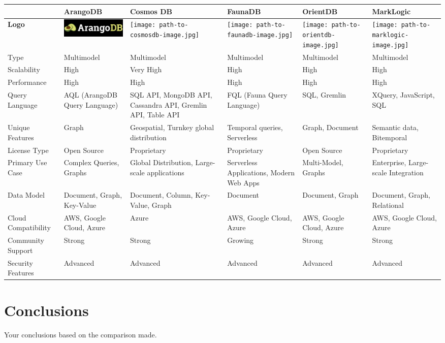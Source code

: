 \documentclass[a3paper,11pt]{extarticle}
\begin{document}
\begin{table}[h!]
\centering
\begin{tabularx}{\textwidth}{|>{\centering\arraybackslash}X|X|X|X|X|X|}
\hline
\rowcolor{gray!25}
& \textbf{ArangoDB} & \textbf{Cosmos DB} & \textbf{FaunaDB} & \textbf{OrientDB} & \textbf{MarkLogic} \\
\hline
\cellcolor{gray!25}\textbf{Logo} & \includegraphics[width=4.5cm]{arango.png} & \texttt{[image: path-to-cosmosdb-image.jpg]} & \texttt{[image: path-to-faunadb-image.jpg]} & \texttt{[image: path-to-orientdb-image.jpg]} & \texttt{[image: path-to-marklogic-image.jpg]} \\
\hline
\rowcolor{gray!15} Type & Multimodel & Multimodel & Multimodel & Multimodel & Multimodel \\
\hline
Scalability & High & Very High & High & High & High \\
\hline
\rowcolor{gray!15} Performance & High & High & High & High & High \\
\hline
Query Language & AQL (ArangoDB Query Language) & SQL API, MongoDB API, Cassandra API, Gremlin API, Table API & FQL (Fauna Query Language) & SQL, Gremlin & XQuery, JavaScript, SQL \\
\hline
\rowcolor{gray!15} Unique Features & Graph & Geospatial, Turnkey global distribution & Temporal queries, Serverless & Graph, Document & Semantic data, Bitemporal \\
\hline
License Type & Open Source & Proprietary & Proprietary & Open Source & Proprietary \\
\hline
\rowcolor{gray!15} Primary Use Case & Complex Queries, Graphs & Global Distribution, Large-scale applications & Serverless Applications, Modern Web Apps & Multi-Model, Graphs & Enterprise, Large-scale Integration \\
\hline
Data Model & Document, Graph, Key-Value & Document, Column, Key-Value, Graph & Document & Document, Graph & Document, Graph, Relational \\
\hline
\rowcolor{gray!15} Cloud Compatibility & AWS, Google Cloud, Azure & Azure & AWS, Google Cloud, Azure & AWS, Google Cloud, Azure & AWS, Google Cloud, Azure \\
\hline
Community Support & Strong & Strong & Growing & Strong & Strong \\
\hline
\rowcolor{gray!15} Security Features & Advanced & Advanced & Advanced & Advanced & Advanced \\
\hline
\end{tabularx}
\end{table}
\newpage

\section*{Conclusions}
Your conclusions based on the comparison made.
\end{document}
